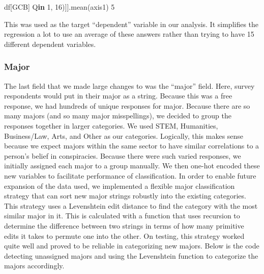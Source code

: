 \documentclass{article}[11pt]
\newenvironment{Shaded}{}{}
\newcommand{\KeywordTok}[1]{\textcolor[rgb]{0.00,0.44,0.13}{\textbf{{#1}}}}
\newcommand{\DecValTok}[1]{\textcolor[rgb]{0.25,0.63,0.44}{{#1}}}
\newcommand{\StringTok}[1]{\textcolor[rgb]{0.25,0.44,0.63}{{#1}}}
\newcommand{\NormalTok}[1]{{#1}}
\begin{document}
\begin{Shaded}
\begin{Highlighting}[]
\NormalTok{df[}\StringTok{\textquotesingle{}GCB\textquotesingle{}}\NormalTok{] }\OperatorTok{=}\NormalTok{ df[[}\StringTok{\textquotesingle{}Q\textquotesingle{}}\OperatorTok{+}\BuiltInTok{str}\NormalTok{(i) }\ControlFlowTok{for}\NormalTok{ i }\KeywordTok{in} \BuiltInTok{range}\NormalTok{(}\DecValTok{1}\NormalTok{, }\DecValTok{16}\NormalTok{)]].mean(axis}\OperatorTok{=}\DecValTok{1}\NormalTok{) }\OperatorTok{/} \DecValTok{5}
\end{Highlighting}
\end{Shaded}

This was used as the target ``dependent'' variable in our analysis. It
simplifies the regression a lot to use an average of these answers
rather than trying to have 15 different dependent variables.

\hypertarget{major}{%
\subsubsection*{Major}\label{major}}

The last field that we made large changes to was the ``major'' field.
Here, survey respondents would put in their major as a string. Because
this was a free response, we had hundreds of unique responses for major.
Because there are so many majors (and so many major misspellings), we
decided to group the responses together in larger categories. We used
STEM, Humanities, Business/Law, Arts, and Other as our categories.
Logically, this makes sense because we expect majors within the same
sector to have similar correlations to a person's belief in
conspiracies. Because there were such varied responses, we initially
assigned each major to a group manually. We then one-hot encoded these
new variables to facilitate performance of classification. In order to
enable future expansion of the data used, we implemented a flexible
major classification strategy that can sort new major strings robustly
into the existing categories. This strategy uses a Levenshtein edit
distance to find the category with the most similar major in it. This is
calculated with a function that uses recursion to determine the
difference between two strings in terms of how many primitive edits it
takes to permute one into the other. On testing, this strategy worked
quite well and proved to be reliable in categorizing new majors. 
\newline
Below is the code detecting unassigned majors and using the Levenshtein
function to categorize the majors accordingly.
\end{document}
